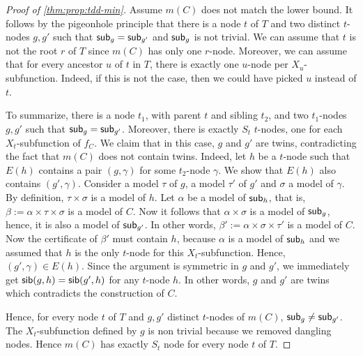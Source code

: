 \documentclass[a4paper,UKenglish,cleveref, autoref, thm-restate]{lipics-v2021}
\newcommand{\guy}[1]{\todo[color=purple]{\color{white}{{\bf Guy}: #1}}}
\newcommand{\yj}[1]{\todo[color=blue]{\color{white}{{\bf YooJung}: #1}}}
\begin{document}
\begin{toappendix}
\begin{proof}[Proof of \cref{thm:prop:tdd-min}]
Assume $m(C)$ does not match the lower bound. It follows by the pigeonhole principle that there is a node $t$ of $T$ and two distinct $t$-nodes $g,g'$ such that $\mathsf{sub}_g = \mathsf{sub}_{g'}$ and $\mathsf{sub}_g$ is not trivial.  We can assume that $t$ is not the root $r$ of $T$ since $m(C)$ has only one $r$-node. Moreover, we can assume that for every ancestor $u$ of $t$ in $T$, there is exactly one $u$-node per $X_u$-subfunction. Indeed, if this is not the case, then we could have picked $u$ instead of $t$.

To summarize, there is a node $t_1$, with parent $t$ and sibling $t_2$, and two $t_1$-nodes $g,g'$ such that $\mathsf{sub}_g=\mathsf{sub}_{g'}$. Moreover, there is exactly $S_t$ $t$-nodes, one for each $X_t$-subfunction of $f_C$. We claim that in this case, $g$ and $g'$ are twins, contradicting the fact that $m(C)$ does not contain twins. Indeed, let $h$ be a $t$-node such that $E(h)$ contains a pair $(g,\gamma)$ for some $t_2$-node $\gamma$. We show that $E(h)$ also contains $(g',\gamma)$. Consider a model $\tau$ of $g$, a model $\tau'$ of $g'$ and $\sigma$ a model of $\gamma$. By definition, $\tau \times \sigma$ is a model of $h$. Let $\alpha$ be a model of $\mathsf{sub}_h$, that is, $\beta := \alpha \times \tau \times \sigma$ is a model of $C$. Now it follows that $\alpha \times \sigma$ is a model of $\mathsf{sub}_g$, hence, it is also a model of $\mathsf{sub}_{g'}$. In other words, $\beta' := \alpha \times \sigma \times \tau'$ is a model of $C$. Now the certificate of $\beta'$ must contain $h$, because $\alpha$ is a model of $\mathsf{sub}_h$ and we assumed that $h$ is the only $t$-node for this $X_t$-subfunction. Hence, $(g',\gamma) \in E(h)$. Since the argument is symmetric in $g$ and $g'$, we immediately get $\sib[h][g]=\sib[h][g']$ for any $t$-node $h$. In other words, $g$ and $g'$ are twins which contradicts the construction of $C$.

Hence, for every node $t$ of $T$ and $g,g'$ distinct $t$-nodes of $m(C)$, $\mathsf{sub}_g \neq \mathsf{sub}_{g'}$. The $X_t$-subfunction defined by $g$ is non trivial because we removed dangling nodes. Hence $m(C)$ has exactly $S_t$ node for every node $t$ of $T$. %
\end{proof}
\end{toappendix}
\end{document}
